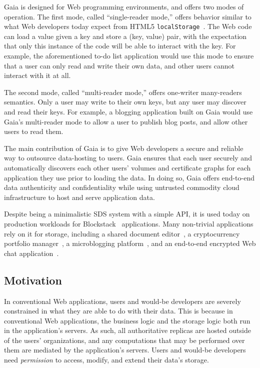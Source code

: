 Gaia is designed for Web programming environments, and offers two
modes of operation.  The first mode, called ``single-reader mode,'' offers
behavior similar to what Web developers today expect from HTML5
\texttt{localStorage}~\cite{w3c-localstorage}.  The Web code can load a value
given a key and store a (key, value) pair, with the expectation that only this
instance of the code will be able to interact with the key.  For example, 
the aforementioned to-do list application would use this mode to ensure that a user can
only read and write their own data, and other users cannot interact with it at
all.

The second mode, called ``multi-reader mode,'' offers one-writer many-readers
semantics.  Only a user may write to their own keys, but any user may discover
and read their keys.  For example, a blogging application built on Gaia would
use Gaia's multi-reader mode to allow a user to publish blog posts, and allow
other users to read them.

The main contribution of Gaia is to give Web developers a secure and
reliable way to outsource data-hosting to users.  Gaia ensures that each user
securely and automatically discovers each other users' volumes and certificate
graphs for each application they use prior to loading the data.
In doing so, Gaia offers end-to-end
data authenticity and confidentiality while using untrusted commodity cloud infrastructure
to host and serve application data.

Despite being a minimalistic SDS system with a simple API, it is used today on
production workloads for Blockstack~\cite{blockstack} applications.  Many
non-trivial applications rely on it for storage, including a shared document
editor~\cite{graphite-docs}, a cryptocurrency portfolio
manager~\cite{coins}, a microblogging
platform~\cite{publik}, and
an end-to-end encrypted Web chat application~\cite{stealthy.im}.

\subsection{Motivation}

In conventional Web applications, users and would-be developers are severely
constrained in what they are able to do with their data.  This is because in
conventional Web applications, the business logic and the storage logic both run
in the application's servers.  As such, all authoritative replicas are hosted
outside of the users' organizations, and any computations that may be performed
over them are mediated by the application's servers.  Users and would-be
developers need \emph{permission} to access, modify, and extend their data's
storage.

